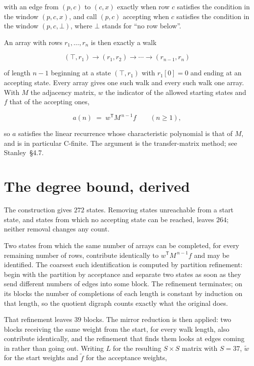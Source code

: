 \documentclass[11pt]{article}
\theoremstyle{definition}
\begin{document}
with an edge from $(p,c)$ to $(c,x)$ exactly when row $c$ satisfies the condition in the window $(p,c,x)$, and call $(p,c)$ accepting when $c$ satisfies the condition in the window $(p,c,\bot)$, where $\bot$ stands for ``no row below''.

An array with rows $r_1,\dots,r_n$ is then exactly a walk

\[(\top,r_1) \to (r_1,r_2) \to \cdots \to (r_{n-1},r_n)\]

of length $n-1$ beginning at a state $(\top,r_1)$ with $r_1[0]=0$ and ending at an accepting state. Every array gives one such walk and every such walk one array. With $M$ the adjacency matrix, $w$ the indicator of the allowed starting states and $f$ that of the accepting ones,

\[a(n) \;=\; w^{\mathsf T} M^{\,n-1} f \qquad (n \ge 1),\]

so $a$ satisfies the linear recurrence whose characteristic polynomial is that of $M$, and is in particular C-finite. The argument is the transfer-matrix method; see Stanley~\S4.7.

\section{The degree bound, derived}

The construction gives $272$ states. Removing states unreachable from a start state, and states from which no accepting state can be reached, leaves $264$; neither removal changes any count.

Two states from which the same number of arrays can be completed, for every remaining number of rows, contribute identically to $w^{\mathsf T}M^{\,n-1}f$ and may be identified. The coarsest such identification is computed by partition refinement: begin with the partition by acceptance and separate two states as soon as they send different numbers of edges into some block. The refinement terminates; on its blocks the number of completions of each length is constant by induction on that length, so the quotient digraph counts exactly what the original does.

That refinement leaves $39$ blocks. The mirror reduction is then applied: two blocks receiving the same weight from the start, for every walk length, also contribute identically, and the refinement that finds them looks at edges coming in rather than going out. Writing $L$ for the resulting $S \times S$ matrix with $S = 37$, $\tilde w$ for the start weights and $\tilde f$ for the acceptance weights,
\end{document}
